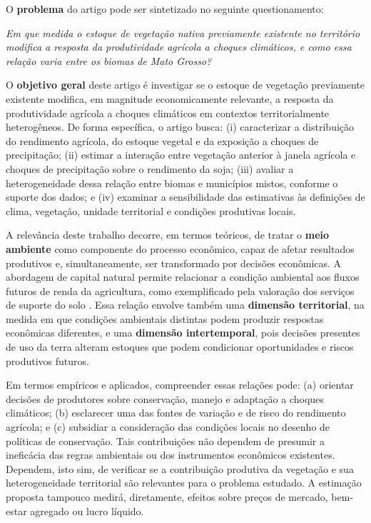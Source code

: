 \medskip
O \textbf{problema} do artigo pode ser sintetizado no seguinte questionamento:

\noindent\emph{Em que medida o estoque de vegetação nativa previamente existente no território modifica a resposta da produtividade agrícola a choques climáticos, e como essa relação varia entre os biomas de Mato Grosso?}

\medskip
O \textbf{objetivo geral} deste artigo é investigar se o estoque de vegetação previamente existente modifica, em magnitude economicamente relevante, a resposta da produtividade agrícola a choques climáticos em contextos territorialmente heterogêneos. De forma específica, o artigo busca: (i) caracterizar a distribuição do rendimento agrícola, do estoque vegetal e da exposição a choques de precipitação; (ii) estimar a interação entre vegetação anterior à janela agrícola e choques de precipitação sobre o rendimento da soja; (iii) avaliar a heterogeneidade dessa relação entre biomas e municípios mistos, conforme o suporte dos dados; e (iv) examinar a sensibilidade das estimativas às definições de clima, vegetação, unidade territorial e condições produtivas locais.

A relevância deste trabalho decorre, em termos teóricos, de tratar o \textbf{meio ambiente} como componente do processo econômico, capaz de afetar resultados produtivos e, simultaneamente, ser transformado por decisões econômicas. A abordagem de capital natural permite relacionar a condição ambiental aos fluxos futuros de renda da agricultura, como exemplificado pela valoração dos serviços de suporte do solo \cite{Brady2015}. Essa relação envolve também uma \textbf{dimensão territorial}, na medida em que condições ambientais distintas podem produzir respostas econômicas diferentes, e uma \textbf{dimensão intertemporal}, pois decisões presentes de uso da terra alteram estoques que podem condicionar oportunidades e riscos produtivos futuros.

Em termos empíricos e aplicados, compreender essas relações pode: (a) orientar decisões de produtores sobre conservação, manejo e adaptação a choques climáticos; (b) esclarecer uma das fontes de variação e de risco do rendimento agrícola; e (c) subsidiar a consideração das condições locais no desenho de políticas de conservação. Tais contribuições não dependem de presumir a ineficácia das regras ambientais ou dos instrumentos econômicos existentes. Dependem, isto sim, de verificar se a contribuição produtiva da vegetação e sua heterogeneidade territorial são relevantes para o problema estudado. A estimação proposta tampouco medirá, diretamente, efeitos sobre preços de mercado, bem-estar agregado ou lucro líquido.

